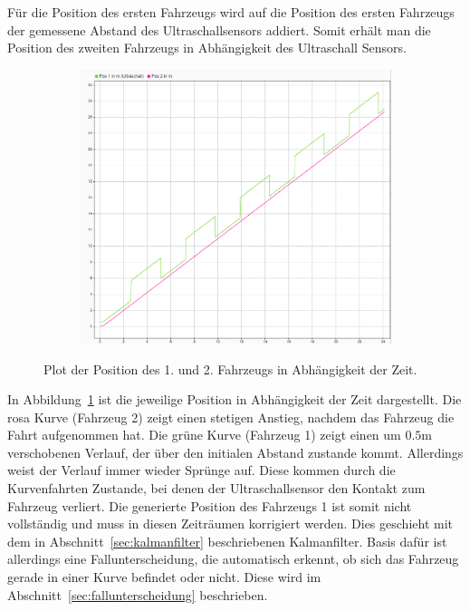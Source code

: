 Für die Position des ersten Fahrzeugs wird auf die Position des ersten Fahrzeugs
der gemessene Abstand des Ultraschallsensors addiert. Somit erhält man die
Position des zweiten Fahrzeugs in Abhängigkeit des Ultraschall Sensors.
\begin{figure}[hbt]
\centering
\begin{subfigure}{0.49\textwidth}
    \centering
    \includegraphics*[width=\textwidth]{figures/zustand_position.png}
\end{subfigure}
    \caption{Plot der Position des 1. und 2. Fahrzeugs in Abhängigkeit der Zeit.
    \label{fig:zustand_position}}
\end{figure}    
In Abbildung~\ref{fig:zustand_position} ist die jeweilige Position in
Abhängigkeit der Zeit dargestellt. Die rosa Kurve (Fahrzeug 2) zeigt einen
stetigen Anstieg, nachdem das Fahrzeug die Fahrt aufgenommen hat. Die grüne
Kurve (Fahrzeug 1) zeigt einen um $0.5 \mathrm{m}$ verschobenen Verlauf, der
über den initialen Abstand zustande kommt. Allerdings weist der Verlauf immer
wieder Sprünge auf. Diese kommen durch die Kurvenfahrten Zustande, bei denen der
Ultraschallsensor den Kontakt zum Fahrzeug verliert. Die generierte Position des
Fahrzeugs 1 ist somit nicht vollständig und muss in diesen Zeiträumen korrigiert
werden. Dies geschieht mit dem in Abschnitt~\ref{sec:kalmanfilter} beschriebenen
Kalmanfilter. Basis dafür ist allerdings eine Fallunterscheidung, die
automatisch erkennt, ob sich das Fahrzeug gerade in einer Kurve befindet oder
nicht. Diese wird im Abschnitt~\ref{sec:fallunterscheidung} beschrieben.

